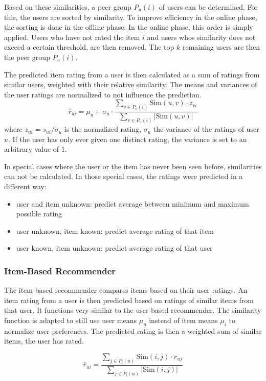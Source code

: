 \documentclass[12pt]{scrartcl}
\newcommand{\abs}[1]{\left\vert #1 \right\vert}
\begin{document}
Based on these similarities, a peer group $P_u(i)$ of users can be determined. For this, the users are sorted by similarity.
To improve efficiency in the online phase, the sorting is done in the offline phase.
In the online phase, this order is simply applied. Users who have not rated the item $i$ and users whos similarity does not exceed a certain threshold, are then removed.
The top $k$ remaining users are then the peer group $P_u(i)$.

The predicted item rating from a user is then calculated as a sum of ratings from similar users, weighted with their relative similarity.
The means and variances of the user ratings are normalized to not influence the prediction.
$$\hat{r}_{ui} = \mu_u + \sigma_u \cdot \frac{\sum\limits_{v \in P_u(i)} \text{Sim}(u, v) \cdot z_{vi}}{\sum\limits_{v \in P_u(i)} \abs{\text{Sim}(u, v)}}$$
where $z_{ui} = s_{ui} / \sigma_u$ is the normalized rating, $\sigma_u$ the variance of the ratings of user $u$.
If the user has only ever given one distinct rating, the variance is set to an arbitrary value of 1.

In special cases where the user or the item has never been seen before, similarities can not be calculated. In those special cases, the ratings were predicted in a different way:

\begin{itemize}
	\item user and item unknown: predict average between minimum and maximum possible rating
	\item user unknown, item known: predict average rating of that item
	\item user known, item unknown: predict average rating of that user
\end{itemize}

\subsubsection[Item-Based]{Item-Based Recommender}
The item-based recommender compares items based on their user ratings. An item rating from a user is then predicted based on ratings of similar items from that user.
It functions very similar to the user-based recommender. The similarity function is adapted to still use user means $\mu_u$ instead of item means $\mu_i$ to normalize user preferences.
The predicted rating is then a weighted sum of similar items, the user has rated.

$$\hat{r}_{ui} = \frac{\sum\limits_{j \in P_i(u)} \text{Sim}(i, j) \cdot r_{uj}}{\sum\limits_{j \in P_i(u)} \abs{\text{Sim}(i, j)}}$$
\end{document}
